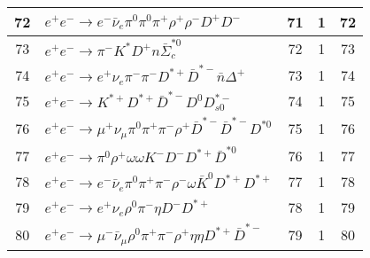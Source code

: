 \documentclass[landscape]{article}
\begin{document}
\begin{table}[htbp!]
\begin{tabular}{|c|>{\centering}p{18cm}|c|c|c|}
\hline
72 & $ e^{+} e^{-} \rightarrow e^{-} \bar{\nu}_{e} \pi^{0} \pi^{0} \pi^{+} \rho^{+} \rho^{-} D^{+} D^{-} $ & 71 & 1 & 72 \\
\hline
73 & $ e^{+} e^{-} \rightarrow \pi^{-} K^{*} D^{+} n \bar{\Sigma}_{c}^{*0} $ & 72 & 1 & 73 \\
\hline
74 & $ e^{+} e^{-} \rightarrow e^{+} \nu_{e} \pi^{-} \pi^{-} D^{*+} \bar{D}^{*-} \bar{n} \Delta^{+} $ & 73 & 1 & 74 \\
\hline
75 & $ e^{+} e^{-} \rightarrow K^{*+} D^{*+} \bar{D}^{*-} D^{0} D_{s0}^{*-} $ & 74 & 1 & 75 \\
\hline
76 & $ e^{+} e^{-} \rightarrow \mu^{+} \nu_{\mu} \pi^{0} \pi^{+} \pi^{-} \rho^{+} \bar{D}^{*-} \bar{D}^{*-} D^{*0} $ & 75 & 1 & 76 \\
\hline
77 & $ e^{+} e^{-} \rightarrow \pi^{0} \rho^{+} \omega \omega K^{-} D^{-} D^{*+} \bar{D}^{*0} $ & 76 & 1 & 77 \\
\hline
78 & $ e^{+} e^{-} \rightarrow e^{-} \bar{\nu}_{e} \pi^{0} \pi^{+} \pi^{-} \rho^{-} \omega \bar{K}^{0} D^{*+} D^{*+} $ & 77 & 1 & 78 \\
\hline
79 & $ e^{+} e^{-} \rightarrow e^{+} \nu_{e} \rho^{0} \pi^{-} \eta D^{-} D^{*+} $ & 78 & 1 & 79 \\
\hline
80 & $ e^{+} e^{-} \rightarrow \mu^{-} \bar{\nu}_{\mu} \rho^{0} \pi^{+} \pi^{-} \rho^{+} \eta \eta D^{*+} \bar{D}^{*-} $ & 79 & 1 & 80 \\
\hline
\end{tabular}
\end{table}

\clearpage
\end{document}
